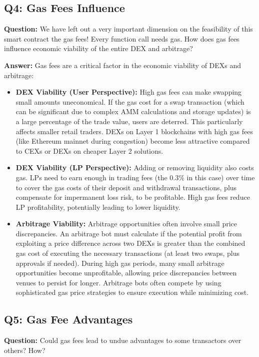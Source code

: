 \documentclass[12pt]{article}
\begin{document}
\subsection{Q4: Gas Fees Influence}
\textbf{Question:} We have left out a very important dimension on the feasibility of this smart contract the gas fees! Every function call needs gas. How does gas fees influence economic viability of the entire DEX and arbitrage?

\textbf{Answer:} Gas fees are a critical factor in the economic viability of DEXs and arbitrage:
\begin{itemize}
    \item \textbf{DEX Viability (User Perspective):} High gas fees can make swapping small amounts uneconomical. If the gas cost for a swap transaction (which can be significant due to complex AMM calculations and storage updates) is a large percentage of the trade value, users are deterred. This particularly affects smaller retail traders. DEXs on Layer 1 blockchains with high gas fees (like Ethereum mainnet during congestion) become less attractive compared to CEXs or DEXs on cheaper Layer 2 solutions.
    \item \textbf{DEX Viability (LP Perspective):} Adding or removing liquidity also costs gas. LPs need to earn enough in trading fees (the 0.3\% in this case) over time to cover the gas costs of their deposit and withdrawal transactions, plus compensate for impermanent loss risk, to be profitable. High gas fees reduce LP profitability, potentially leading to lower liquidity.
    \item \textbf{Arbitrage Viability:} Arbitrage opportunities often involve small price discrepancies. An arbitrage bot must calculate if the potential profit from exploiting a price difference across two DEXs is greater than the combined gas cost of executing the necessary transactions (at least two swaps, plus approvals if needed). During high gas periods, many small arbitrage opportunities become unprofitable, allowing price discrepancies between venues to persist for longer. Arbitrage bots often compete by using sophisticated gas price strategies to ensure execution while minimizing cost.
\end{itemize}

\subsection{Q5: Gas Fee Advantages}
\textbf{Question:} Could gas fees lead to undue advantages to some transactors over others? How?
\end{document}
